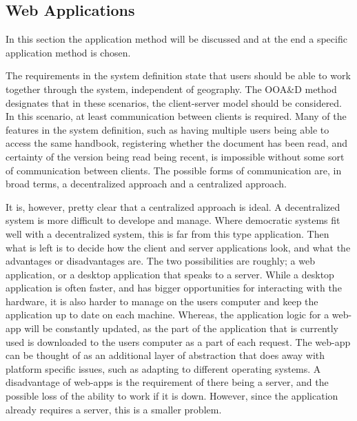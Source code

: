 \subsection{Web Applications}
In this section the application method will be discussed and at the end a specific application method is chosen.

The requirements in the system definition state that users should be able to work together through the system, independent of geography.
The OOA\&D method designates that in these scenarios, the client-server model should be considered.
In this scenario, at least communication between clients is required.
Many of the features in the system definition, such as having multiple users being able to access the same handbook, registering whether the document has been read, and certainty of the version being read being recent, is impossible without some sort of communication between clients.
The possible forms of communication are, in broad terms, a decentralized approach and a centralized approach.

It is, however, pretty clear that a centralized approach is ideal.
A decentralized system is more difficult to develope and manage.
Where democratic systems fit well with a decentralized system, this is far from this type application.
Then what is left is to decide how the client and server applications look, and what the advantages or disadvantages are.
The two possibilities are roughly; a web application, or a desktop application that speaks to a server.
While a desktop application is often faster, and has bigger opportunities for interacting with the hardware, it is also harder to manage on the users computer and keep the application up to date on each machine.
Whereas, the application logic for a web-app will be constantly updated, as the part of the application that is currently used is downloaded to the users computer as a part of each request.
The web-app can be thought of as an additional layer of abstraction that does away with platform specific issues, such as adapting to different operating systems.
A disadvantage of web-apps is the requirement of there being a server, and the possible loss of the ability to work if it is down.
However, since the application already requires a server, this is a smaller problem.

